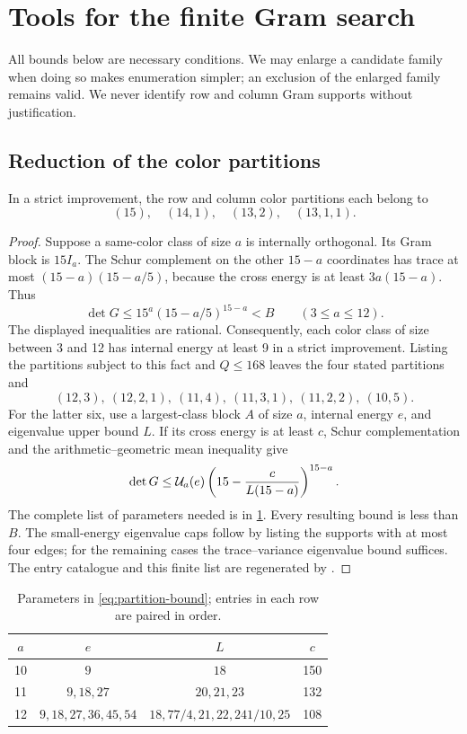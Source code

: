 \section{Tools for the finite Gram search}\label{sec:tools}
All bounds below are necessary conditions. We may enlarge a candidate family when doing so makes enumeration simpler; an exclusion of the enlarged family remains valid. We never identify row and column Gram supports without justification.

\subsection{Reduction of the color partitions}\label{sec:partitions}
\begin{lemma}\label{lem:partitions}
In a strict improvement, the row and column color partitions each belong to
\[
 (15),\quad(14,1),\quad(13,2),\quad(13,1,1).
\]
\end{lemma}
\begin{proof}
Suppose a same-color class of size $a$ is internally orthogonal. Its Gram block is $15I_a$. The Schur complement on the other $15-a$ coordinates has trace at most $(15-a)(15-a/5)$, because the cross energy is at least $3a(15-a)$. Thus
\[
 \det G\le15^a(15-a/5)^{15-a}<B\qquad(3\le a\le12).
\]
The displayed inequalities are rational. Consequently, each color class of size between 3 and 12 has internal energy at least 9 in a strict improvement. Listing the partitions subject to this fact and $Q\le168$ leaves the four stated partitions and
\[
 (12,3),\ (12,2,1),\ (11,4),\ (11,3,1),\ (11,2,2),\ (10,5).
\]
For the latter six, use a largest-class block $A$ of size $a$, internal energy $e$, and eigenvalue upper bound $L$. If its cross energy is at least $c$, Schur complementation and the arithmetic--geometric mean inequality give
\begin{equation}\label{eq:partition-bound}
 \det G\le\mathcal U_a(e)\left(15-\frac{c}{L(15-a)}\right)^{15-a}.
\end{equation}
The complete list of parameters needed is in \cref{tab:partition}. Every resulting bound is less than $B$. The small-energy eigenvalue caps follow by listing the supports with at most four edges; for the remaining cases the trace--variance eigenvalue bound suffices. The entry catalogue and this finite list are regenerated by .
\end{proof}
\begin{table}[ht]
\centering
\caption{Parameters in \eqref{eq:partition-bound}; entries in each row are paired in order.}\label{tab:partition}
\begin{tabular}{@{}cccc@{}}\toprule
$a$ & $e$ & $L$ & $c$\\\midrule
10 & $9$ & $18$ &150\\
11 & $9,18,27$ & $20,21,23$ &132\\
12 & $9,18,27,36,45,54$ & $18,77/4,21,22,241/10,25$ &108\\\bottomrule
\end{tabular}
\end{table}

